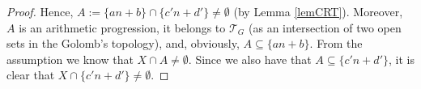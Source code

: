 \documentclass{amsart}
\theoremstyle{definition}
\theoremstyle{definition}
\newcommand{\T}{\mathcal{T}}
\newcommand{\B}{\mathcal{B}}
\begin{document}
\begin{proof}
Hence, $A:= \{an+b\}\cap\{c'n+d'\} \neq \emptyset$ (by Lemma \ref{lemCRT}). Moreover, $A$ is an arithmetic progression, it belongs to $\T_G$ (as an intersection of two open sets in the Golomb's topology), and, obviously, $A \subseteq \{an+b\}$. From the assumption we know that $X\cap A \neq \emptyset$. Since we also have that $A \subseteq \{c'n+d'\}$, it is clear that $X\cap \{c'n+d'\} \neq \emptyset$.
\end{proof}
\end{document}
